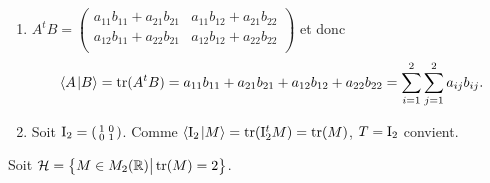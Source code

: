 \documentclass[a4paper,12pt,reqno]{amsart}
\begin{document}
\begin{solution}
  \begin{enumerate}
    \item $A^{t}B=
            \begin{pmatrix}
              a_{11}b_{11} + a_{21}b_{21} & a_{11}b_{12} + a_{21}b_{22}\\
              a_{12}b_{11} + a_{22}b_{21} & a_{12}b_{12} + a_{22}b_{22}\\
            \end{pmatrix}
          $
          et donc
    \[
      \langle{A}\kern1pt |{B}\rangle = \operatorname{tr}(A^{t}B) = a_{11}b_{11} + a_{21}b_{21} + a_{12}b_{12} + a_{22}b_{22} = \sum_{i=1}^{2}\sum_{j=1}^{2} a_{ij}b_{ij}.
    \]
    \item\label{id} Soit $\mathrm{I}_{2}=\begin{psmallmatrix} 1 & 0\\ 0 & 1\end{psmallmatrix}$. Comme $\langle{\mathrm{I}_{2}}\kern1pt |{M}\rangle=\operatorname{tr}(\mathrm{I}_{2}^{t}M)=\operatorname{tr}(M)$, $T=\mathrm{I}_{2}$ convient.
  \end{enumerate}

  Soit $\mathcal{H}=\big\{ M \in M_2(\mathbb{R})\big| \operatorname{tr}(M)=2 \big\}$.


\end{solution}
\end{document}
